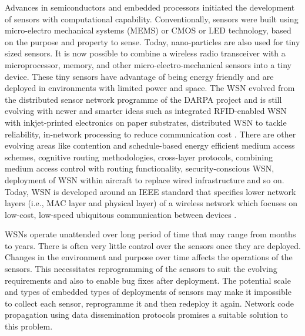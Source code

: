 \documentclass[conference,final]{IEEEtran}
\begin{document}
Advances in semiconductors and embedded processors initiated the development of sensors with computational capability. 
Conventionally, sensors were built using micro-electro mechanical systems (MEMS) or CMOS or LED technology, based on the purpose and property to sense. 
Today, nano-particles are also used for tiny sized sensors.
It is now possible to combine a wireless radio transceiver with a microprocessor, memory, and other micro-electro-mechanical sensors into a tiny device.
These tiny sensors have advantage of being energy friendly and are deployed in environments with limited power and space.
The WSN evolved from the distributed sensor network programme of the DARPA project and is still evolving with newer and smarter ideas such as integrated RFID-enabled WSN with inkjet-printed electronics on paper substrates,  distributed WSN to tackle reliability, in-network processing to reduce communication cost \cite{5498900}. 
There are other evolving areas like contention and schedule-based energy efficient medium access schemes, cognitive routing methodologies, cross-layer protocols, combining medium access control with routing functionality, security-conscious WSN,  deployment of WSN within aircraft to replace  wired infrastructure and so on.
Today, WSN is developed around an IEEE standard that specifies lower network layers (i.e., MAC layer and physical layer) of a wireless network which focuses on low-cost, low-speed ubiquitous communication between devices \cite{893287}.

WSNs operate unattended over long period of time that may range from months to years.
There is often very little control over the sensors once they are deployed.
Changes in the environment and purpose over time affects the operations of the sensors. 
This necessitates reprogramming of the sensors to suit the evolving requirements and also to enable bug fixes after deployment.
The potential scale and types of embedded types of deployments of sensors may make it impossible to collect each sensor, reprogramme it and then redeploy it again. 
Network code propagation using data dissemination protocols promises a suitable solution to this problem.
\end{document}
